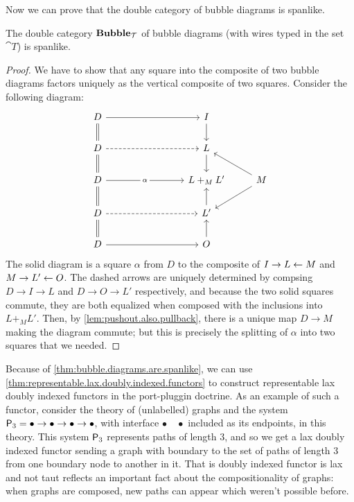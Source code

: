 \documentclass[DynamicalBook]{subfiles}
\begin{document}
    Now we can prove that the double category of bubble diagrams is spanlike.
\begin{theorem}\label{thm:bubble.diagrams.are.spanlike}
The double category $\textbf{Bubble}_{\mathcal{T}}$ of bubble diagrams (with wires typed in the set $\cat{T}$) is spanlike.
  \end{theorem}
  \begin{proof}
    We have to show that any square into the composite of two bubble diagrams factors uniquely as the vertical composite of two squares. Consider the following diagram:
    \[
\begin{tikzcd}
	D &&& I \\
	D && {} & L \\
	D &&& {L +_M L'} & M \\
	D &&& {L'} \\
	D &&& O
	\arrow[from=1-1, to=2-1, equals]
	\arrow[from=2-1, to=3-1, equals]
	\arrow[from=3-1, to=4-1, equals]
	\arrow[from=4-1, to=5-1, equals]
	\arrow[from=1-1, to=1-4]
	\arrow[from=5-1, to=5-4]
	\arrow[from=1-4, to=2-4]
	\arrow[from=3-5, to=2-4]
	\arrow[from=3-5, to=4-4]
	\arrow[from=5-4, to=4-4]
	\arrow[from=2-4, to=3-4]
	\arrow[from=4-4, to=3-4]
	\arrow["\alpha"{description}, from=3-1, to=3-4]
	\arrow[dashed, from=2-1, to=2-4]
	\arrow[dashed, from=4-1, to=4-4]
\end{tikzcd}
    \]
    The solid diagram is a square $\alpha$ from $D$ to the composite of $I \to L \leftarrow M$ and $M \to L' \leftarrow O$. The dashed arrows are uniquely determined by compsing $D \to I \to L$ and $D \to O \to L'$ respectively, and because the two solid squares commute, they are both equalized when composed with the inclusions into $L +_{M} L'$. Then, by \cref{lem:pushout.also.pullback}, there is a unique map $D \to M$ making the diagram commute; but this is precisely the splitting of $\alpha$ into two squares that we needed.
  \end{proof}

Because of \cref{thm:bubble.diagrams.are.spanlike}, we can use \cref{thm:representable.lax.doubly.indexed.functors} to construct representable lax doubly indexed functors in the port-pluggin doctrine. As an example of such a functor, consider the theory of (unlabelled) graphs and the system $\mathsf{P}_{3} = \bullet \to \bullet \to \bullet \to \bullet$, with interface $\bullet \quad \bullet$ included as its endpoints, in this theory. This system $\mathsf{P}_{3}$ represents paths of length $3$, and so we get a lax doubly indexed functor sending a graph with boundary to the set of paths of length $3$ from one boundary node to another in it. That is doubly indexed functor is lax and not taut reflects an important fact about the compositionality of graphs: when graphs are composed, new paths can appear which weren't possible before.
\end{document}
